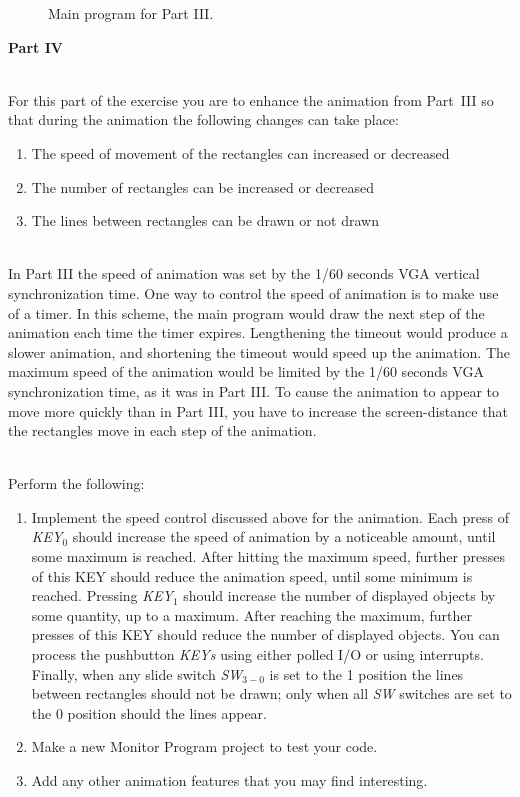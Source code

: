 \documentclass[epsfig,10pt,fullpage]{article}
\begin{document}
\begin{figure}[H]
\centering

\caption{Main program for Part III.}
\label{fig:main3}
\end{figure}

\newpage
\noindent
{\bf Part IV}

\noindent
~\\
For this part of the exercise you are to enhance the animation from Part~III so that
during the animation the following changes can take place:

\begin{enumerate}
\item
The speed of movement of the rectangles can increased or decreased
\item
The number of rectangles can be increased or decreased
\item
The lines between rectangles can be drawn or not drawn
\end{enumerate}

~\\
\noindent
In Part III the speed of animation was set by the 1/60 seconds VGA vertical synchronization time.
One way to control the speed of animation is to make use of a timer. In this scheme, the main 
program would draw the next step of the animation each time the timer expires.  Lengthening 
the timeout would produce a slower animation, and shortening the timeout would speed up the 
animation. The maximum speed 
of the animation would be limited by the 1/60 seconds VGA synchronization time, as it was in 
Part III.  To cause the animation to appear to move more quickly than in Part III, you
have to increase the screen-distance that the rectangles move in each step of the animation.

~\\
\noindent
Perform the following:

\begin{enumerate}

\item Implement the speed control discussed above for the animation. Each press of {\it KEY}$_0$
should increase the speed of animation by a noticeable amount, until some maximum is reached. 
After hitting the maximum speed, further presses of this KEY should reduce the animation speed,
until some minimum is reached. Pressing {\it KEY}$_1$ should increase the number of displayed 
objects by some quantity, up to a maximum. After reaching the maximum, further presses of this
KEY should reduce the number of displayed objects.  You can process
the pushbutton {\it KEYs} using either polled I/O or using interrupts. Finally, when
any slide switch {\it SW}$_{3-0}$ is set to the 1 position the lines between rectangles should 
not be drawn; only when all {\it SW} switches are set to the 0 position should the lines appear.

\item Make a new Monitor Program project to test your code.

\item Add any other animation features that you may find interesting.
\end{enumerate}
\end{document}
